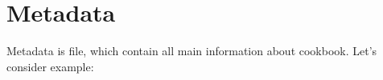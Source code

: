 \section{Metadata}

Metadata is file, which contain all main information about cookbook. Let's consider example:

